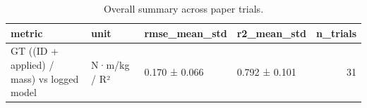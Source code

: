 \begin{table}
\caption{Overall summary across paper trials.}
\label{tab:table3_overall}
\begin{tabular}{llllr}
\toprule
metric & unit & rmse\_mean\_std & r2\_mean\_std & n\_trials \\
\midrule
GT ((ID + applied) / mass) vs logged model & N·m/kg / R² & 0.170 ± 0.066 & 0.792 ± 0.101 & 31 \\
\bottomrule
\end{tabular}
\end{table}
